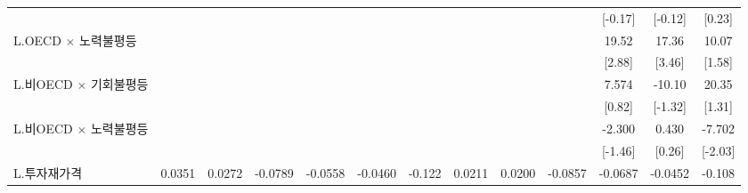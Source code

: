 \begin{tabular}{l*{12}{c}}
                    &                     &                     &                     &                     &                     &                     &                     &                     &                     &     [-0.17]         &     [-0.12]         &      [0.23]         \\
\addlinespace
L.OECD $\times$ 노력불평등&                     &                     &                     &                     &                     &                     &                     &                     &                     &       19.52\sym{***}&       17.36\sym{***}&       10.07         \\
                    &                     &                     &                     &                     &                     &                     &                     &                     &                     &      [2.88]         &      [3.46]         &      [1.58]         \\
\addlinespace
L.비OECD $\times$ 기회불평등&                     &                     &                     &                     &                     &                     &                     &                     &                     &       7.574         &      -10.10         &       20.35         \\
                    &                     &                     &                     &                     &                     &                     &                     &                     &                     &      [0.82]         &     [-1.32]         &      [1.31]         \\
\addlinespace
L.비OECD $\times$ 노력불평등&                     &                     &                     &                     &                     &                     &                     &                     &                     &      -2.300         &       0.430         &      -7.702\sym{**} \\
                    &                     &                     &                     &                     &                     &                     &                     &                     &                     &     [-1.46]         &      [0.26]         &     [-2.03]         \\
\addlinespace
L.투자재가격        &      0.0351         &      0.0272         &     -0.0789         &     -0.0558         &     -0.0460         &      -0.122         &      0.0211         &      0.0200         &     -0.0857         &     -0.0687         &     -0.0452         &      -0.108         \\

\end{tabular}
